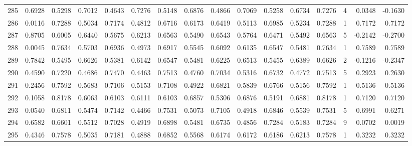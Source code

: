 \begin{tabular}{lrrrrrrrrrrrrrrr}
285 &      0.6928 &  0.5298 &  0.7012 &  0.4643 &  0.7276 &  0.5148 &  0.6876 &  0.4866 &  0.7069 &  0.5258 &   0.6734 &     0.7276 &      4 &                    0.0348 &                    -0.1630 \\
286 &      0.0116 &  0.7288 &  0.5034 &  0.7174 &  0.4812 &  0.6716 &  0.6173 &  0.6419 &  0.5113 &  0.6985 &   0.5234 &     0.7288 &      1 &                    0.7172 &                     0.7172 \\
287 &      0.8705 &  0.6005 &  0.6440 &  0.5675 &  0.6213 &  0.6563 &  0.5490 &  0.6543 &  0.5764 &  0.6471 &   0.5492 &     0.6563 &      5 &                   -0.2142 &                    -0.2700 \\
288 &      0.0045 &  0.7634 &  0.5703 &  0.6936 &  0.4973 &  0.6917 &  0.5545 &  0.6092 &  0.6135 &  0.6547 &   0.5481 &     0.7634 &      1 &                    0.7589 &                     0.7589 \\
289 &      0.7842 &  0.5495 &  0.6626 &  0.5381 &  0.6142 &  0.6547 &  0.5481 &  0.6225 &  0.6513 &  0.5455 &   0.6389 &     0.6626 &      2 &                   -0.1216 &                    -0.2347 \\
290 &      0.4590 &  0.7220 &  0.4686 &  0.7470 &  0.4463 &  0.7513 &  0.4760 &  0.7034 &  0.5316 &  0.6732 &   0.4772 &     0.7513 &      5 &                    0.2923 &                     0.2630 \\
291 &      0.2456 &  0.7592 &  0.5683 &  0.7106 &  0.5153 &  0.7108 &  0.4922 &  0.6821 &  0.5839 &  0.6766 &   0.5156 &     0.7592 &      1 &                    0.5136 &                     0.5136 \\
292 &      0.1058 &  0.8178 &  0.6063 &  0.6103 &  0.6111 &  0.6103 &  0.6857 &  0.5306 &  0.6876 &  0.5191 &   0.6881 &     0.8178 &      1 &                    0.7120 &                     0.7120 \\
293 &      0.0540 &  0.6811 &  0.5474 &  0.7142 &  0.4466 &  0.7531 &  0.5073 &  0.7105 &  0.4918 &  0.6846 &   0.5539 &     0.7531 &      5 &                    0.6991 &                     0.6271 \\
294 &      0.6582 &  0.6601 &  0.5512 &  0.7028 &  0.4919 &  0.6898 &  0.5481 &  0.6735 &  0.4856 &  0.7284 &   0.5183 &     0.7284 &      9 &                    0.0702 &                     0.0019 \\
295 &      0.4346 &  0.7578 &  0.5035 &  0.7181 &  0.4888 &  0.6852 &  0.5568 &  0.6174 &  0.6172 &  0.6186 &   0.6213 &     0.7578 &      1 &                    0.3232 &                     0.3232 \\

\end{tabular}
